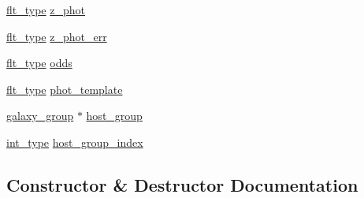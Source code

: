 \begin{DoxyCompactItemize}
\item 
\hyperlink{lib_2IceBRG__main_2common_8h_ad0f130a56eeb944d9ef2692ee881ecc4}{flt\+\_\+type} \hyperlink{classIceBRG_1_1galaxy_a0b3002808e23ef0e4f4d2f59c8d5a17c}{z\+\_\+phot}
\item 
\hyperlink{lib_2IceBRG__main_2common_8h_ad0f130a56eeb944d9ef2692ee881ecc4}{flt\+\_\+type} \hyperlink{classIceBRG_1_1galaxy_a5e57bc37cf982498c52e5c6c3c878f4c}{z\+\_\+phot\+\_\+err}
\item 
\hyperlink{lib_2IceBRG__main_2common_8h_ad0f130a56eeb944d9ef2692ee881ecc4}{flt\+\_\+type} \hyperlink{classIceBRG_1_1galaxy_a2082d872c11623ab2e7f9b56ee83de67}{odds}
\item 
\hyperlink{lib_2IceBRG__main_2common_8h_ad0f130a56eeb944d9ef2692ee881ecc4}{flt\+\_\+type} \hyperlink{classIceBRG_1_1galaxy_a4813caea7e6a4c3f72432d8ede2c1b78}{phot\+\_\+template}
\item 
\hyperlink{classIceBRG_1_1galaxy__group}{galaxy\+\_\+group} $\ast$ \hyperlink{classIceBRG_1_1galaxy_ae2d1ad9d4a67d7a8cc9ad04b982d9357}{host\+\_\+group}
\item 
\hyperlink{lib_2IceBRG__main_2common_8h_ac4de9d9335536ac22821171deec8d39e}{int\+\_\+type} \hyperlink{classIceBRG_1_1galaxy_ac876724577eece4895e7b0c174ec26bf}{host\+\_\+group\+\_\+index}
\end{DoxyCompactItemize}


\subsection{Constructor \& Destructor Documentation}
\hypertarget{classIceBRG_1_1galaxy_addd35301cca549dd4ed3631a4dcb628e}{}
